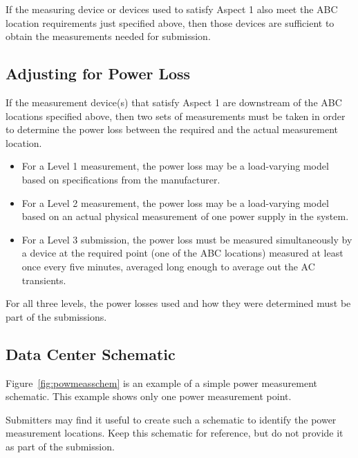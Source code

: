 \noindent
If the measuring device or devices used to satisfy Aspect 1 also meet the ABC location requirements just specified above, then those devices are sufficient to obtain the measurements needed for submission.

\subsection{Adjusting for Power Loss}
\label{sec:AfPL}
\noindent
If the measurement device(s) that satisfy Aspect 1 are downstream of the ABC locations specified above, then two sets of measurements must be taken in order to determine the power loss between the required and the actual measurement location. 

\begin{itemize}
\item
For a Level 1 measurement, the power loss may be a load-varying model based on specifications from the manufacturer.  
\item
For a Level 2 measurement, the power loss may be a load-varying model based on an actual physical measurement of one power supply in the system.  
\item
For a Level 3 submission, the power loss must be measured simultaneously by a device at the required point (one of the ABC locations) measured at least once every five minutes, averaged long enough to average out the AC transients. 
\end{itemize}

\noindent
For all three levels, the power losses used and how they were determined must be part of the submissions.

\subsection{Data Center Schematic}
\noindent
Figure~\ref{fig:powmeasschem} is an example of a simple power measurement schematic. This example shows only one power measurement point.
\wl


\noindent
Submitters may find it useful to create such a schematic to identify the power measurement locations. Keep this schematic for reference, but do not provide it as part of the submission.

